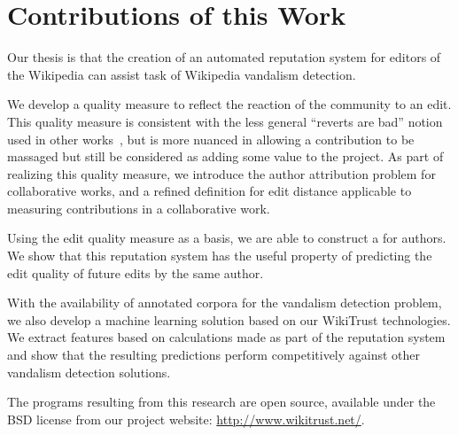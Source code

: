 \section{Contributions of this Work}

Our thesis is that the creation of an automated reputation system
for editors of the Wikipedia can assist 
task of Wikipedia vandalism detection.

We develop a quality measure to reflect the reaction of
the community to an edit.
This quality measure is consistent with the less general
``reverts are bad'' notion used in other
works~\cite{Smets2008,Itakura2009,Belani2010,West2010},
but is more nuanced in allowing a contribution to be massaged
but still be considered as adding some value to the project.
As part of realizing this quality measure, we introduce the
author attribution problem for collaborative works,
and a refined definition for edit distance applicable to
measuring contributions in a collaborative work.

Using the edit quality measure as a basis, we are able
to construct a  for authors.
We show that this reputation system has the useful property
of predicting the edit quality of future edits by the same
author.

With the availability of annotated corpora for the vandalism
detection problem, we also develop a machine learning solution based on our
WikiTrust technologies.
We extract features based on calculations made as part of the
reputation system and show that the resulting predictions perform
competitively against other vandalism detection solutions.

The programs resulting from this research are open source,
available under the BSD license from our project website:
\url{http://www.wikitrust.net/}.

